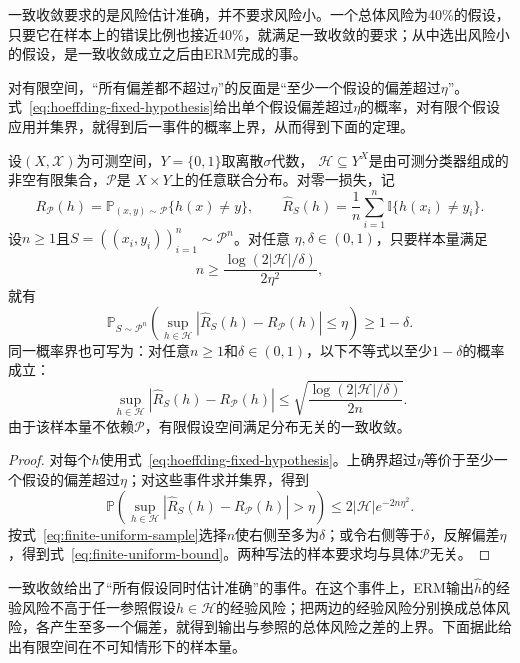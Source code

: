 一致收敛要求的是风险估计准确，并不要求风险小。一个总体风险为40\%的假设，只要它在样本上的错误比例也接近40\%，就满足一致收敛的要求；从中选出风险小的假设，是一致收敛成立之后由ERM完成的事。

对有限空间，“所有偏差都不超过$\eta$”的反面是“至少一个假设的偏差超过$\eta$”。式~\eqref{eq:hoeffding-fixed-hypothesis}给出单个假设偏差超过$\eta$的概率，对有限个假设应用并集界，就得到后一事件的概率上界，从而得到下面的定理。

\begin{theorem}[有限假设空间的一致收敛样本量界]
\label{thm:finite-uniform-convergence}
设$(X,\mathcal X)$为可测空间，$Y=\{0,1\}$取离散$\sigma$代数，
$\mathcal H\subseteq Y^X$是由可测分类器组成的非空有限集合，$\mathcal P$是
$X\times Y$上的任意联合分布。对零一损失，记
\[
 R_{\mathcal P}(h)=\mathbb P_{(x,y)\sim\mathcal P}\{h(x)\neq y\},\qquad
 \hat R_S(h)=\frac1n\sum_{i=1}^n\mathbb I\{h(x_i)\neq y_i\}.
\]
设$n\geq1$且$S=((x_i,y_i))_{i=1}^n\sim\mathcal P^n$。对任意
$\eta,\delta\in(0,1)$，只要样本量满足
\begin{equation}
 n\geq\frac{\log(2|\mathcal H|/\delta)}{2\eta^2},
 \label{eq:finite-uniform-sample}
\end{equation}
就有
\[
 \mathbb P_{S\sim\mathcal P^n}\left(
 \sup_{h\in\mathcal H}|\hat R_S(h)-R_{\mathcal P}(h)|\leq\eta
 \right)\geq1-\delta.
\]
同一概率界也可写为：对任意$n\geq1$和$\delta\in(0,1)$，以下不等式以至少$1-\delta$的概率成立：
\begin{equation}
 \sup_{h\in\mathcal H}|\hat R_S(h)-R_{\mathcal P}(h)|
 \leq\sqrt{\frac{\log(2|\mathcal H|/\delta)}{2n}}.
 \label{eq:finite-uniform-bound}
\end{equation}
由于该样本量不依赖$\mathcal P$，有限假设空间满足分布无关的一致收敛。
\end{theorem}

\begin{proof}
对每个$h$使用式~\eqref{eq:hoeffding-fixed-hypothesis}。上确界超过$\eta$等价于至少一个假设的偏差超过$\eta$；对这些事件求并集界，得到
\[
 \mathbb P\left(\sup_{h\in\mathcal H}|\hat R_S(h)-R_{\mathcal P}(h)|>\eta\right)
 \leq 2|\mathcal H|e^{-2n\eta^2}.
\]
按式~\eqref{eq:finite-uniform-sample}选择$n$使右侧至多为$\delta$；或令右侧等于$\delta$，反解偏差$\eta$，得到式~\eqref{eq:finite-uniform-bound}。两种写法的样本要求均与具体$\mathcal P$无关。
\end{proof}

一致收敛给出了“所有假设同时估计准确”的事件。在这个事件上，ERM输出$\hat h$的经验风险不高于任一参照假设$h\in\mathcal H$的经验风险；把两边的经验风险分别换成总体风险，各产生至多一个偏差，就得到输出与参照的总体风险之差的上界。下面据此给出有限空间在不可知情形下的样本量。

